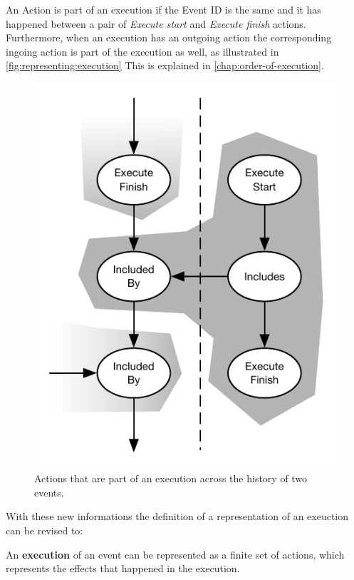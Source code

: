     \newpar
    An Action is part of an execution if the Event ID is the same and it has happened between a pair of \textit{Execute start} and \textit{Execute finish} actions. Furthermore, when an execution has an outgoing action the corresponding ingoing action is part of the execution as well, as illustrated in \autoref{fig:representing:execution} This is explained in \autoref{chap:order-of-execution}.
    
    \begin{figure}[H]
		\centering
		\includegraphics[height=\textheight/4]{3local/images/execution.pdf}
		\caption{Actions that are part of an execution across the history of two events.}
		\label{fig:representing:execution}
	\end{figure}
    
	With these new informations the definition of a representation of an exeuction can be revised to:
	
	\begin{definition}
		An \textbf{execution} of an event can be represented as a finite set of actions, which represents the effects that happened in the execution.
	\end{definition}
	
